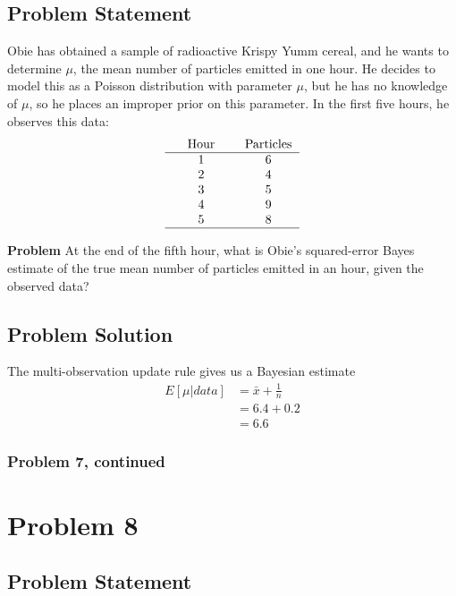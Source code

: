 \documentclass[12pt]{article}
\theoremstyle{definition}
\begin{document}
\subsection*{Problem Statement}

Obie has obtained a sample of radioactive Krispy Yumm cereal, and he wants to determine $\mu$, the mean number of particles emitted in one hour. He decides to model this as a Poisson distribution with parameter $\mu$, but he has no knowledge of $\mu$, so he places an improper prior on this parameter. In the first five hours, he observes this data:
$$
\begin{tabular}{ccccc}
& Hour & & Particles\\
\hline
& 1 & & 6\\
& 2 & & 4\\
& 3 & & 5\\
& 4 & & 9\\
& 5 & & 8\\
\hline
\end{tabular}
$$

\bigskip
\noindent
{\bf Problem} At the end of the fifth hour, what is Obie's squared-error Bayes estimate of the true mean number of particles emitted in an hour, given the observed data?


\subsection*{Problem Solution}
The multi-observation update rule gives us a Bayesian estimate
\begin{align*}
E[\mu|data] &= \bar{x} + \frac{1}{n}\\
&= 6.4 + 0.2\\
&= 6.6
\end{align*}

\newpage
\subsubsection*{Problem 7, continued}




\newpage
\section*{Problem 8}

\subsection*{Problem Statement}
\end{document}
